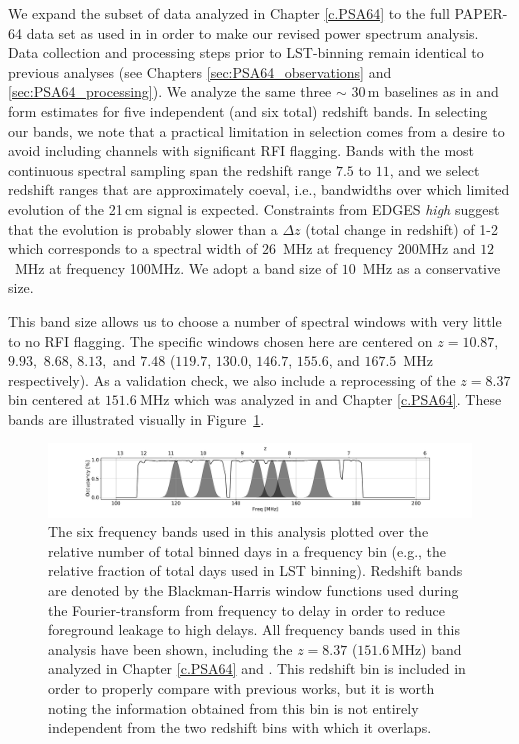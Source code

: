 We expand the subset of data analyzed in Chapter \ref{c.PSA64} to the full PAPER-64 data set as used in  in order to make our revised power spectrum analysis. Data collection and processing steps prior to LST-binning remain identical to previous analyses (see Chapters \ref{sec:PSA64_observations} and \ref{sec:PSA64_processing}). We analyze the same three $\sim$ 30\,m baselines as in  and form estimates for five independent (and six total) redshift bands. In selecting our bands, we note that a practical limitation in selection
comes from a desire to avoid including channels with significant RFI flagging.
Bands with the most continuous spectral sampling span the redshift range $7.5$ to $11$, and we select redshift ranges that are approximately coeval, i.e., bandwidths over which limited evolution of the 21\,cm signal is expected.
Constraints from EDGES \emph{high} suggest that the evolution is probably slower than a $\Delta z$ (total change in
redshift) of 1-2 \citep{monsalve_et_al2017} 
which corresponds to a spectral width of $ 26 $~MHz at frequency 200MHz and 
$12$~MHz at frequency 100MHz.  We adopt a band size of $10$~MHz as a conservative size.

This band size allows us to choose a number of spectral windows with very little to no RFI flagging.  The specific windows chosen here are centered on
$z=10.87,$ $9.93,$ $8.68$, $8.13,$ and $7.48$ ($119.7$, $130.0$, $146.7$, $155.6$, and $167.5$~MHz respectively).
As a validation check, we also include
a reprocessing of the $z=8.37$ bin centered at $151.6~$MHz
which was analyzed in  and Chapter \ref{c.PSA64}.
These bands are illustrated visually in Figure~\ref{fig:freq_select}.

\begin{figure}[t]
\centering
\includegraphics[trim={4cm 0  5cm 0},width=\textwidth]{plots/freq_select_BH.pdf}
\caption{The six frequency bands used in this analysis plotted over the relative number of total binned days in a frequency bin (e.g., the relative fraction of total days used in LST binning).
Redshift bands are denoted by the
Blackman-Harris window functions used during
the Fourier-transform from frequency to delay in order
to reduce foreground leakage to high delays.
All frequency bands used in this analysis have been shown, including the $z=8.37$ ($151.6$\,MHz) band analyzed in Chapter \ref{c.PSA64} and \citet{ali_et_al2015}.
This redshift bin is included in order
to properly compare with previous works,
but it is worth noting the information
obtained from this bin is not entirely independent from the two
redshift bins with which it overlaps.
\label{fig:freq_select}}
\end{figure}

